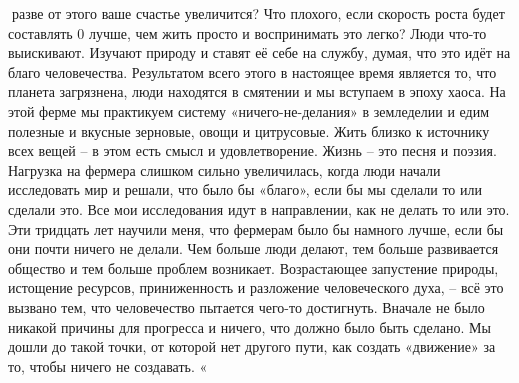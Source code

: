 \documentclass[a4paper]{book}
\begin{document}
разве от этого ваше счастье увеличится? Что плохого, если скорость роста будет составлять
0 %
лучше, чем жить просто и воспринимать это легко?
Люди что-то выискивают. Изучают природу и ставят её себе на службу, думая, что это
идёт на благо человечества. Результатом всего этого в настоящее время является то, что
планета загрязнена, люди находятся в смятении и мы вступаем в эпоху хаоса.
На этой ферме мы практикуем систему «ничего-не-делания» в земледелии и едим
полезные и вкусные зерновые, овощи и цитрусовые. Жить близко к источнику всех вещей – в
этом есть смысл и удовлетворение. Жизнь – это песня и поэзия.
Нагрузка на фермера слишком сильно увеличилась, когда люди начали исследовать мир
и решали, что было бы «благо», если бы мы сделали то или сделали это. Все мои
исследования идут в направлении, как не делать то или это.
Эти тридцать лет научили меня, что фермерам было бы намного лучше, если бы они
почти ничего не делали.
Чем больше люди делают, тем больше развивается общество и тем больше проблем
возникает. Возрастающее запустение природы, истощение ресурсов, приниженность и
разложение человеческого духа, – всё это вызвано тем, что человечество пытается чего-то
достигнуть. Вначале не было никакой причины для прогресса и ничего, что должно было
быть сделано. Мы дошли до такой точки, от которой нет другого пути, как создать
«движение» за то, чтобы ничего не создавать.
«
\end{document}
